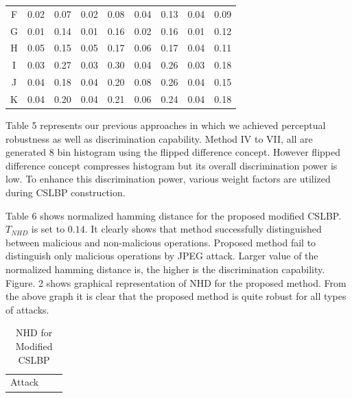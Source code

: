 \documentclass[12pt,a4paper]{jihmsp}
\begin{document}
{{\begin{table} [h]
\begin{tabular}{*9c}
		F  & 0.02	 & 0.07	 & 0.02	 & 0.08	 & 0.04	 & 0.13   & 0.04 & 0.09 \\	
		
		G  & 0.01	 & 0.14	 & 0.01	 & 0.16	 & 0.02	 & 0.16   & 0.01 & 0.12 \\	
		
		H  & 0.05	 & 0.15	 & 0.05	 & 0.17	 & 0.06	 & 0.17   & 0.04 & 0.11 \\	
		
		I  & 0.03	 & 0.27	 & 0.03	 & 0.30	 & 0.04	 & 0.26   & 0.03 & 0.18 \\	
		
		J  & 0.04	 & 0.18	 & 0.04	 & 0.20	 & 0.08	 & 0.26   & 0.04 & 0.15 \\	
		
		K  & 0.04	 & 0.20	 & 0.04	 & 0.21	 & 0.06	 & 0.24   & 0.04 & 0.18 \\	
		
		\bottomrule
		
	\end{tabular}
	
\end{table}


Table 5 represents our previous approaches in which we achieved perceptual robustness as well as discrimination capability. Method IV to VII, all are generated 8 bin histogram using the flipped difference concept. However flipped difference concept compresses histogram but its overall discrimination power is low. To enhance this discrimination power, various weight factors are utilized during CSLBP construction. 
\par 
Table 6 shows normalized hamming distance for the proposed modified CSLBP. $T_{NHD}$ is set to $0.14$. It clearly shows that method successfully distinguished between malicious and non-malicious operations. Proposed method fail to distinguish only malicious operations by JPEG attack. Larger value of the normalized hamming distance is, the higher is the discrimination capability. Figure. 2 shows graphical representation of NHD for the proposed method. From the above graph it is clear that the proposed method is quite robust for all types of attacks.
\begin{table}[h]
	\centering
	\caption{NHD for Modified CSLBP}
	\footnotesize
	\centering
	\begin{tabular}{*3c}
		
		\toprule
		
		Attack
		

\end{tabular}
\end{table}}}
\end{document}
